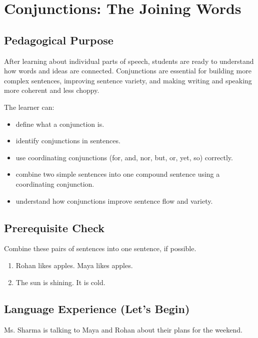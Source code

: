 
\chapter{Conjunctions: The Joining Words}

\section{Pedagogical Purpose}
After learning about individual parts of speech, students are ready to understand how words and ideas are connected. Conjunctions are essential for building more complex sentences, improving sentence variety, and making writing and speaking more coherent and less choppy.

\begin{learningobjectives}
The learner can:
\begin{itemize}
    \item define what a conjunction is.
    \item identify conjunctions in sentences.
    \item use coordinating conjunctions (for, and, nor, but, or, yet, so) correctly.
    \item combine two simple sentences into one compound sentence using a coordinating conjunction.
    \item understand how conjunctions improve sentence flow and variety.
\end{itemize}
\end{learningobjectives}

\section{Prerequisite Check}
\begin{quickcheck}
Combine these pairs of sentences into one sentence, if possible.
\begin{enumerate}
    \item Rohan likes apples. Maya likes apples.
    \item The sun is shining. It is cold.
\end{enumerate}
\end{quickcheck}

\section{Language Experience (Let's Begin)}
Ms. Sharma is talking to Maya and Rohan about their plans for the weekend.

